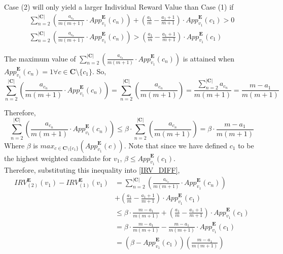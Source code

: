 \documentclass{article}
\begin{document}
Case (2) will only yield a larger Individual Reward Value than Case (1) if 
\begin{gather}
\sum^{|\pmb{C}|}_{n = 2}{\left(\frac{a_{c_{n}}}{m(m+1)}\cdot{App}^{\pmb{E}}_{v_1}(c_{n})\right)} + \left(\frac{a_1}{m}-\frac{a_{1}+1}{m+1}\right)\cdot{App}^{\pmb{E}}_{v_1}(c_1) > 0\nonumber\\
\sum^{|\pmb{C}|}_{n = 2}{\left(\frac{a_{c_{n}}}{m(m+1)}\cdot{App}^{\pmb{E}}_{v_1}(c_{n})\right)} > \left(\frac{a_1}{m}-\frac{a_{1}+1}{m+1}\right)\cdot{App}^{\pmb{E}}_{v_1}(c_1)
\end{gather}

The maximum value of $\sum^{|\pmb{C}|}_{n = 2}{\left(\frac{a_{c_{n}}}{m(m+1)}\cdot{App}^{\pmb{E}}_{v_1}(c_{n})\right)}$ is attained when ${App}^{\pmb{E}}_{v_1}(c_{n}) = 1 \forall {c} \in \pmb{C} \setminus \{c_1\}$. So,
\begin{equation}
\sum^{|\pmb{C}|}_{n = 2}{\left(\frac{a_{c_{n}}}{m(m+1)}\cdot{App}^{\pmb{E}}_{v_1}(c_{n})\right)} = \sum^{|\pmb{C}|}_{n = 2}{\left(\frac{a_{c_{n}}}{m(m+1)}\right)} = \frac{\sum^{|\pmb{C}|}_{n = 2}{a_{c_{n}}}}{m(m+1)} = \frac{m-a_1}{m(m+1)}
\end{equation}

Therefore,
\begin{equation}
\sum^{|\pmb{C}|}_{n = 2}{\left(\frac{a_{c_{n}}}{m(m+1)}\cdot{App}^{\pmb{E}}_{v_1}(c_{n})\right)} \leq \beta\cdot\sum^{|\pmb{C}|}_{n = 2}{\left(\frac{a_{c_{n}}}{m(m+1)}\right)} = \beta\cdot\frac{m-a_1}{m(m+1)}
\end{equation}
Where $\beta$ is ${max}_{c \in \pmb{C} \setminus \{c_1\}}\left({App}^{\pmb{E}}_{v_1}(c)\right)$. Note that since we have defined $c_1$ to be the highest weighted candidate for $v_1$, $\beta \leq {App}^{\pmb{E}}_{v_1}(c_1)$.\\

Therefore, substituting this inequality into \eqref{IRV_DIFF},
\begin{equation}
\begin{aligned}
{IRV}^{\pmb{E}}_{(2)}(v_1) - {IRV}^{\pmb{E}}_{(1)}(v_1)
&=  \sum^{|\pmb{C}|}_{n = 2}{\left(\frac{a_{c_{n}}}{m(m+1)}\cdot{App}^{\pmb{E}}_{v_1}(c_{n})\right)}\\
&+ \left(\frac{a_1}{m}-\frac{a_{1}+1}{m+1}\right)\cdot{App}^{\pmb{E}}_{v_1}(c_1)\\
&\leq \beta\cdot\frac{m-a_1}{m(m+1)} + \left(\frac{a_1}{m}-\frac{a_{1}+1}{m+1}\right)\cdot{App}^{\pmb{E}}_{v_1}(c_1)\\
&= \beta\cdot\frac{m-a_1}{m(m+1)} - \frac{m-a_1}{m(m+1)}\cdot{App}^{\pmb{E}}_{v_1}(c_1)\\
&= \left(\beta - {App}^{\pmb{E}}_{v_1}(c_1)\right)\left(\frac{m-a_1}{m(m+1)}\right)
\end{aligned} 
\end{equation}\\
\end{document}
